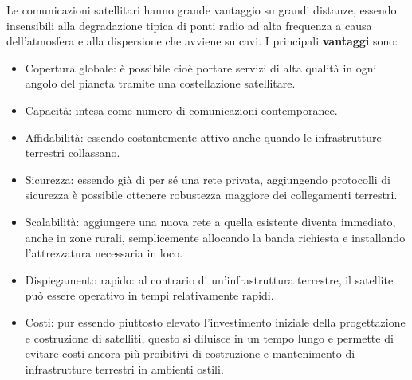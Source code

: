 \documentclass[12pt,a4paper,oneside]{book}
\begin{document}
			Le comunicazioni satellitari hanno grande vantaggio su grandi distanze, essendo insensibili alla degradazione tipica di ponti radio ad alta frequenza a causa dell'atmosfera e alla dispersione che avviene su cavi.
			I principali {\bf vantaggi} sono: 
			\begin{itemize}
				\item Copertura globale: è possibile cioè portare servizi di alta qualità in ogni angolo del pianeta tramite una costellazione satellitare. 
				\item Capacità: intesa come numero di comunicazioni contemporanee.
				\item Affidabilità: essendo costantemente attivo anche quando le infrastrutture terrestri collassano.
				\item Sicurezza: essendo già di per sé una rete privata, aggiungendo protocolli di sicurezza è possibile ottenere robustezza maggiore dei collegamenti terrestri.
				\item Scalabilità: aggiungere una nuova rete a quella esistente diventa immediato, anche in zone rurali, semplicemente allocando la banda richiesta e installando l'attrezzatura necessaria in loco.
				\item Dispiegamento rapido: al contrario di un'infrastruttura terrestre, il satellite può essere operativo in tempi relativamente rapidi.				
				\item Costi: pur essendo piuttosto elevato l'investimento iniziale della progettazione e costruzione di satelliti, questo si diluisce in un tempo lungo e permette di evitare costi ancora più proibitivi di costruzione e mantenimento di infrastrutture terrestri in ambienti ostili.				
			\end{itemize} 
		
\end{document}
